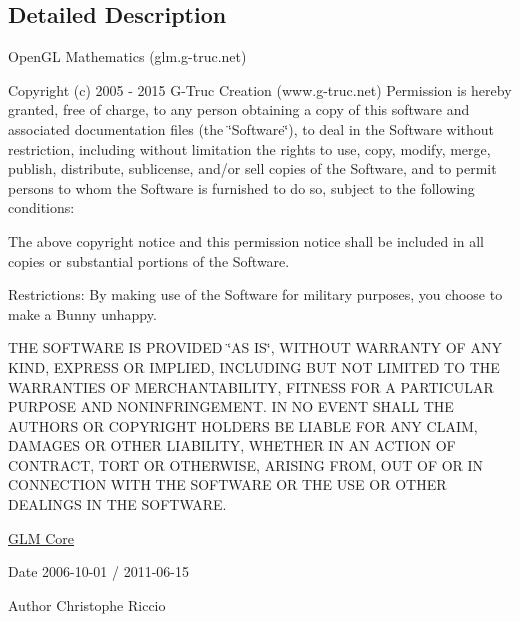 \subsection{Detailed Description}
Open\-G\-L Mathematics (glm.\-g-\/truc.\-net)

Copyright (c) 2005 -\/ 2015 G-\/\-Truc Creation (www.\-g-\/truc.\-net) Permission is hereby granted, free of charge, to any person obtaining a copy of this software and associated documentation files (the \char`\"{}\-Software\char`\"{}), to deal in the Software without restriction, including without limitation the rights to use, copy, modify, merge, publish, distribute, sublicense, and/or sell copies of the Software, and to permit persons to whom the Software is furnished to do so, subject to the following conditions\-:

The above copyright notice and this permission notice shall be included in all copies or substantial portions of the Software.

Restrictions\-: By making use of the Software for military purposes, you choose to make a Bunny unhappy.

T\-H\-E S\-O\-F\-T\-W\-A\-R\-E I\-S P\-R\-O\-V\-I\-D\-E\-D \char`\"{}\-A\-S I\-S\char`\"{}, W\-I\-T\-H\-O\-U\-T W\-A\-R\-R\-A\-N\-T\-Y O\-F A\-N\-Y K\-I\-N\-D, E\-X\-P\-R\-E\-S\-S O\-R I\-M\-P\-L\-I\-E\-D, I\-N\-C\-L\-U\-D\-I\-N\-G B\-U\-T N\-O\-T L\-I\-M\-I\-T\-E\-D T\-O T\-H\-E W\-A\-R\-R\-A\-N\-T\-I\-E\-S O\-F M\-E\-R\-C\-H\-A\-N\-T\-A\-B\-I\-L\-I\-T\-Y, F\-I\-T\-N\-E\-S\-S F\-O\-R A P\-A\-R\-T\-I\-C\-U\-L\-A\-R P\-U\-R\-P\-O\-S\-E A\-N\-D N\-O\-N\-I\-N\-F\-R\-I\-N\-G\-E\-M\-E\-N\-T. I\-N N\-O E\-V\-E\-N\-T S\-H\-A\-L\-L T\-H\-E A\-U\-T\-H\-O\-R\-S O\-R C\-O\-P\-Y\-R\-I\-G\-H\-T H\-O\-L\-D\-E\-R\-S B\-E L\-I\-A\-B\-L\-E F\-O\-R A\-N\-Y C\-L\-A\-I\-M, D\-A\-M\-A\-G\-E\-S O\-R O\-T\-H\-E\-R L\-I\-A\-B\-I\-L\-I\-T\-Y, W\-H\-E\-T\-H\-E\-R I\-N A\-N A\-C\-T\-I\-O\-N O\-F C\-O\-N\-T\-R\-A\-C\-T, T\-O\-R\-T O\-R O\-T\-H\-E\-R\-W\-I\-S\-E, A\-R\-I\-S\-I\-N\-G F\-R\-O\-M, O\-U\-T O\-F O\-R I\-N C\-O\-N\-N\-E\-C\-T\-I\-O\-N W\-I\-T\-H T\-H\-E S\-O\-F\-T\-W\-A\-R\-E O\-R T\-H\-E U\-S\-E O\-R O\-T\-H\-E\-R D\-E\-A\-L\-I\-N\-G\-S I\-N T\-H\-E S\-O\-F\-T\-W\-A\-R\-E.

\hyperlink{group__core}{G\-L\-M Core}

\begin{DoxyDate}{Date}
2006-\/10-\/01 / 2011-\/06-\/15 
\end{DoxyDate}
\begin{DoxyAuthor}{Author}
Christophe Riccio 
\end{DoxyAuthor}
